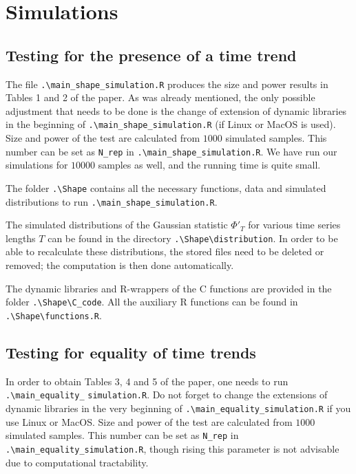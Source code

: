 \documentclass[a4paper,12pt]{article}
\begin{document}
\newpage

\everypar{\hangafter=0\relax}




\section*{Simulations}


\subsection*{Testing for the presence of a time trend}

The file \verb|.\main_shape_simulation.R| produces the size and power results in Tables 1 and 2 of the paper. As was already mentioned, the only possible adjustment that needs to be done is the change of extension of dynamic libraries in the beginning of \verb|.\main_shape_simulation.R| (if Linux or MacOS is used). 
Size and power of the test are calculated from $1000$ simulated samples. This number can be set as \verb|N_rep| in \verb|.\main_shape_simulation.R|. We have run our simulations for $10000$ samples as well, and the running time is quite small.

The folder \verb|.\Shape| contains all the necessary functions, data and simulated distributions to run \verb|.\main_shape_simulation.R|. 

The simulated distributions of the Gaussian statistic $\Phi'_{T}$ for various time series lengths $T$ can be found in the directory \verb|.\Shape\distribution|. In order to be able to recalculate these distributions, the stored files need to be deleted or removed; the computation is then done automatically.

The dynamic libraries and R-wrappers of the C functions are provided in the folder \verb|.\Shape\C_code|.
All the auxiliary R functions can be found in \verb|.\Shape\functions.R|.


\subsection*{Testing for equality of time trends}


In order to obtain Tables 3, 4 and 5 of the paper, one needs to run \verb|.\main_equality_| \verb|simulation.R|. Do not forget to change the extensions of dynamic libraries in the very beginning of \verb|.\main_equality_simulation.R| if you use Linux or MacOS.
Size and power of the test are calculated from $1000$ simulated samples. This number can be set as \verb|N_rep| in \verb|.\main_equality_simulation.R|, though rising this parameter is not advisable due to computational tractability. 
\end{document}
